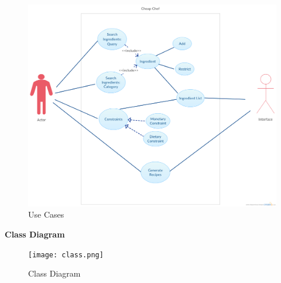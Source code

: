 \documentclass[12pt]{article}
\begin{document}
\newpage
\begin{figure}
  \includegraphics[width=\linewidth]{usecases.png}
  \caption{Use Cases}
  \label{fig: usecases}
\end{figure}

\newpage
\begin{center}
  \textbf{Class Diagram}
  \begin{figure}
    \texttt{[image: class.png]}
    \caption{Class Diagram}
    \label{fig: class}
  \end{figure}
\end{center}
\end{document}
